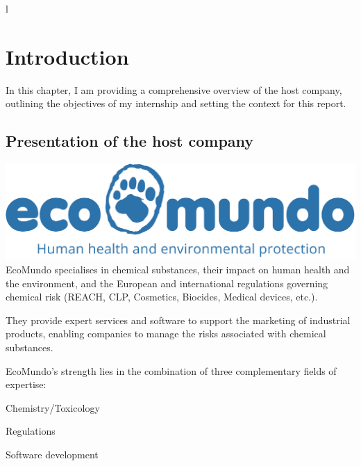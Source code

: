 l\documentclass[a4paper,12pt,twoside]{report}
\begin{document}

\thispagestyle{empty}



\newpage

\chapter{Introduction}
In this chapter, I am providing a comprehensive overview of the host company, outlining the objectives of my internship and setting the context for this report.
\section{Presentation of the host company}
\includegraphics[width=\textwidth]{images/ecomundo}
EcoMundo \cite{ecomundo} specialises in chemical substances, their impact on human health and the environment, and the European and international regulations governing chemical risk (REACH, CLP, Cosmetics, Biocides, Medical devices, etc.).

They provide expert services and software to support the marketing of industrial products, enabling companies to manage the risks associated with chemical substances.

EcoMundo's strength lies in the combination of three complementary fields of expertise:

\itemize[label=$\bullet$] 
\item Chemistry/Toxicology
\item Regulations
\item Software development
\end{document}
